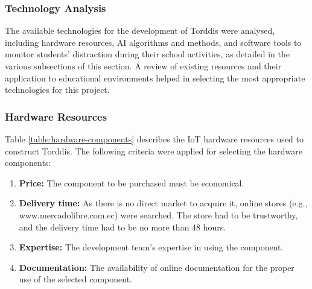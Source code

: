\documentclass[a4paper,fleqn]{cas-sc}
\begin{document}
			\subsubsection{Technology Analysis}
				The available technologies for the development of Torddis were analysed, including hardware resources, AI algorithms and methods, and software tools to monitor students’ distraction during their school activities, as detailed in the various subsections of this section. A review of existing resources and their application to educational environments helped in selecting the most appropriate technologies for this project.
				
				\subsubsection*{Hardware Resources}
					Table \ref{table:hardware-components} describes the IoT hardware resources used to construct Torddis. The following criteria were applied for selecting the hardware components:
					\begin{enumerate}
					\item \textbf{Price:} The component to be purchased must be economical.
					\item \textbf{Delivery time:} As there is no direct market to acquire it, online stores (e.g., www.mercadolibre.com.ec) were searched. The store had to be trustworthy, and the delivery time had to be no more than 48 hours.
					\item \textbf{Expertise:} The development team's expertise in using the component.
					\item \textbf{Documentation:} The availability of online documentation for the proper use of the selected component.
					\end{enumerate}
					
\end{document}
